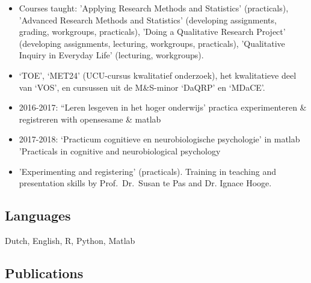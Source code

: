 \documentclass[
  letterpaper,
  DIV=11,
  numbers=noendperiod,
  oneside]{scrartcl}
\begin{document}
\begin{itemize}
\item
  Courses taught: 'Applying Research Methods and Statistics'
  (practicals), 'Advanced Research Methods and Statistics' (developing
  assignments, grading, workgroups, practicals), 'Doing a Qualitative
  Research Project' (developing assignments, lecturing, workgroups,
  practicals), 'Qualitative Inquiry in Everyday Life' (lecturing,
  workgroups).
\item
  `TOE', `MET24' (UCU-cursus kwalitatief onderzoek), het kwalitatieve
  deel van `VOS', en cursussen uit de M\&S-minor `DaQRP' en `MDaCE'.
\item
  2016-2017: ``Leren lesgeven in het hoger onderwijs' practica
  experimenteren \& registreren with opensesame \& matlab
\item
  2017-2018: `Practicum cognitieve en neurobiologische psychologie' in
  matlab 'Practicals in cognitive and neurobiological psychology
\item
  'Experimenting and registering' (practicals). Training in teaching and
  presentation skills by Prof.~Dr.~Susan te Pas and Dr. Ignace Hooge.
\end{itemize}

\hypertarget{languages}{%
\subsection{Languages}\label{languages}}

Dutch, English, R, Python, Matlab

\hypertarget{publications}{%
\subsection{Publications}\label{publications}}
\end{document}
